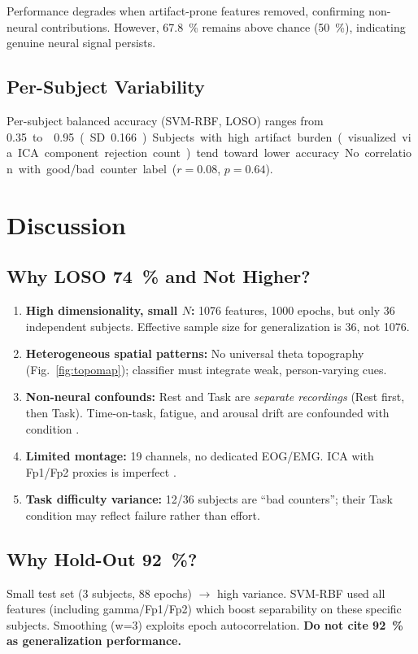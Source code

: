 \documentclass[conference]{IEEEtran}
\begin{document}
Performance degrades when artifact-prone features removed, confirming non-neural contributions. However, \SI{67.8}{\%} remains above chance (\SI{50}{\%}), indicating genuine neural signal persists.

\subsection{Per-Subject Variability}
Per-subject balanced accuracy (SVM-RBF, LOSO) ranges from \texttildelow\SI{0.35} to \texttildelow\SI{0.95} (SD \SI{0.166}). Subjects with high artifact burden (visualized via ICA component rejection count) tend toward lower accuracy. No correlation with good/bad counter label ($r = 0.08$, $p = 0.64$).

\section{Discussion}

\subsection{Why LOSO \texttildelow\SI{74}{\%} and Not Higher?}
\begin{enumerate}
    \item \textbf{High dimensionality, small $N$:} \num{1076} features, \texttildelow\num{1000} epochs, but only \num{36} independent subjects. Effective sample size for generalization is \num{36}, not \num{1076}.
    \item \textbf{Heterogeneous spatial patterns:} No universal theta topography (Fig.~\ref{fig:topomap}); classifier must integrate weak, person-varying cues.
    \item \textbf{Non-neural confounds:} Rest and Task are \textit{separate recordings} (Rest first, then Task). Time-on-task, fatigue, and arousal drift are confounded with condition \cite{berka2007eeg}.
    \item \textbf{Limited montage:} \num{19} channels, no dedicated EOG/EMG. ICA with Fp1/Fp2 proxies is imperfect \cite{puce2017review}.
    \item \textbf{Task difficulty variance:} 12/36 subjects are ``bad counters''; their Task condition may reflect failure rather than effort.
\end{enumerate}

\subsection{Why Hold-Out \texttildelow\SI{92}{\%}?}
Small test set (\num{3} subjects, \num{88} epochs) $\rightarrow$ high variance. SVM-RBF used all features (including gamma/Fp1/Fp2) which boost separability on these specific subjects. Smoothing (w=3) exploits epoch autocorrelation. \textbf{Do not cite \SI{92}{\%} as generalization performance.}
\end{document}
